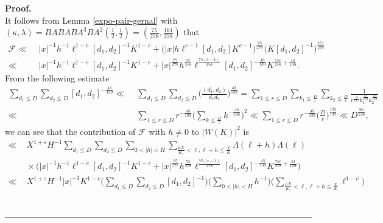 \documentclass[a4paper,oneside,11pt]{article}%
\newenvironment{proof}[1][Proof]{\noindent \textbf{#1.} }{\  \rule{0.5em}{0.5em}}
\numberwithin{equation}{section}
\begin{document}
\begin{proof}
\begin{equation*}
\end{equation*}
It follows from Lemma \ref{expo-pair-gernal} with
$(\kappa,\lambda)=BA BA BA^3 BA^2 (\frac{1}{2},\frac{1}{2})=(\frac{75}{278},\frac{161}{278})$ that
\begin{align*}
       \mathscr{F}
\ll & \,\, |x|^{-1}h^{-1}\ell^{1-c}[d_1,d_2]^{-1}K^{1-c}+\big(|x|h\ell^{c-1}[d_1,d_2]K^{c-1}\big)^{\frac{75}{278}}
        \big(K[d_1,d_2]^{-1}\big)^{\frac{161}{278}}
               \nonumber \\
\ll & \,\, |x|^{-1}h^{-1}\ell^{1-c}[d_1,d_2]^{-1}K^{1-c}+|x|^{\frac{75}{278}}h^{\frac{75}{278}}\ell^{\frac{75(c-1)}{278}}
           [d_1,d_2]^{-\frac{43}{139}}K^{\frac{75c}{278}+\frac{43}{139}}.
\end{align*}
From the following estimate
\begin{align*}
            \sum_{d_1\leqslant D}\sum_{d_2\leqslant D}[d_1,d_2]^{-\frac{43}{139}}
 \ll & \,\, \sum_{d_1\leqslant D}\sum_{d_2\leqslant D}\bigg(\frac{(d_1,d_2)}{d_1d_2}\bigg)^{\frac{43}{139}}
            =\sum_{1\leqslant r\leqslant D}\sum_{k_1\leqslant\frac{D}{r}}\sum_{k_2\leqslant\frac{D}{r}}
            \frac{1}{r^{\frac{43}{139}}k_1^{\frac{43}{139}}k_2^{\frac{43}{139}}}
                      \nonumber \\
 \ll & \,\, \sum_{1\leqslant r\leqslant D}r^{-\frac{43}{139}}\Bigg(\sum_{k\leqslant \frac{D}{r}}k^{-\frac{43}{139}}\Bigg)^2
            \ll\sum_{1\leqslant r\leqslant D}r^{-\frac{43}{139}}\bigg(\frac{D}{r}\bigg)^{\frac{192}{139}}
            \ll D^{\frac{96}{139}},
\end{align*}
we can see that the contribution of $\mathscr{F}$ with $h\not=0$ to $|W(K)|^2$ is
\begin{align*}
\ll & \,\, X^{1+\varepsilon}H^{-1}\sum_{d_1\leqslant D}\sum_{d_2\leqslant D}\sum_{0<|h|<H}
           \sum_{\frac{\mu X}{K_1}<\ell,\ell+h\leqslant\frac{X}{K}}\Lambda(\ell+h)\Lambda(\ell)
                    \nonumber \\
 & \,\, \times \Big(|x|^{-1}h^{-1}\ell^{1-c}[d_1,d_2]^{-1}K^{1-c}+|x|^{\frac{75}{278}}h^{\frac{75}{278}}
               \ell^{\frac{75(c-1)}{278}}[d_1,d_2]^{-\frac{43}{139}}K^{\frac{75c}{278}+\frac{43}{139}}\Big)
                    \nonumber \\
\ll & \,\, X^{1+\varepsilon}H^{-1}|x|^{-1}K^{1-c}\Bigg(\sum_{d_1\leqslant D}\sum_{d_2\leqslant D}[d_1,d_2]^{-1}\Bigg)
           \Bigg(\sum_{0<|h|<H}h^{-1}\Bigg)\Bigg(\sum_{\frac{\mu X}{K_1}<\ell,\ell+h\leqslant\frac{X}{K}}\ell^{1-c}\Bigg)
                     \nonumber \\

\end{align*}
\end{proof}
\end{document}

